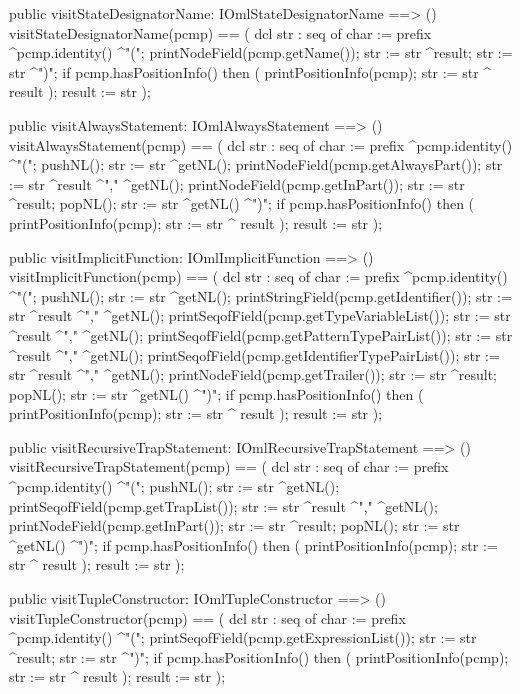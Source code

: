 \begin{vdm_al}
  public visitStateDesignatorName: IOmlStateDesignatorName ==> ()
  visitStateDesignatorName(pcmp) ==
    ( dcl str : seq of char := prefix ^pcmp.identity() ^"(";
      printNodeField(pcmp.getName());
      str := str ^result;
      str := str ^")";
      if pcmp.hasPositionInfo()
      then ( printPositionInfo(pcmp);
             str := str ^ result );
      result := str );

  public visitAlwaysStatement: IOmlAlwaysStatement ==> ()
  visitAlwaysStatement(pcmp) ==
    ( dcl str : seq of char := prefix ^pcmp.identity() ^"(";
      pushNL();
      str := str ^getNL();
      printNodeField(pcmp.getAlwaysPart());
      str := str ^result ^"," ^getNL();
      printNodeField(pcmp.getInPart());
      str := str ^result;
      popNL();
      str := str ^getNL() ^")";
      if pcmp.hasPositionInfo()
      then ( printPositionInfo(pcmp);
             str := str ^ result );
      result := str );

  public visitImplicitFunction: IOmlImplicitFunction ==> ()
  visitImplicitFunction(pcmp) ==
    ( dcl str : seq of char := prefix ^pcmp.identity() ^"(";
      pushNL();
      str := str ^getNL();
      printStringField(pcmp.getIdentifier());
      str := str ^result ^"," ^getNL();
      printSeqofField(pcmp.getTypeVariableList());
      str := str ^result ^"," ^getNL();
      printSeqofField(pcmp.getPatternTypePairList());
      str := str ^result ^"," ^getNL();
      printSeqofField(pcmp.getIdentifierTypePairList());
      str := str ^result ^"," ^getNL();
      printNodeField(pcmp.getTrailer());
      str := str ^result;
      popNL();
      str := str ^getNL() ^")";
      if pcmp.hasPositionInfo()
      then ( printPositionInfo(pcmp);
             str := str ^ result );
      result := str );

  public visitRecursiveTrapStatement: IOmlRecursiveTrapStatement ==> ()
  visitRecursiveTrapStatement(pcmp) ==
    ( dcl str : seq of char := prefix ^pcmp.identity() ^"(";
      pushNL();
      str := str ^getNL();
      printSeqofField(pcmp.getTrapList());
      str := str ^result ^"," ^getNL();
      printNodeField(pcmp.getInPart());
      str := str ^result;
      popNL();
      str := str ^getNL() ^")";
      if pcmp.hasPositionInfo()
      then ( printPositionInfo(pcmp);
             str := str ^ result );
      result := str );

  public visitTupleConstructor: IOmlTupleConstructor ==> ()
  visitTupleConstructor(pcmp) ==
    ( dcl str : seq of char := prefix ^pcmp.identity() ^"(";
      printSeqofField(pcmp.getExpressionList());
      str := str ^result;
      str := str ^")";
      if pcmp.hasPositionInfo()
      then ( printPositionInfo(pcmp);
             str := str ^ result );
      result := str );


\end{vdm_al}

